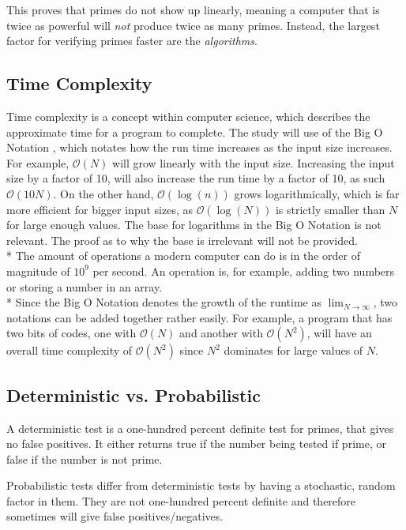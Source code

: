 \documentclass[main.tex]{subfiles}
\begin{document}
This proves that primes do not show up linearly, meaning a computer that is
twice as powerful will \textit{not} produce twice as many primes. Instead, the
largest factor for verifying primes faster are the \textit{algorithms}.

\subsection{Time Complexity}

Time complexity \cite{theorem:time_comp} is a concept within computer science,
which describes the approximate time for a program to complete. The study will
use of the Big O Notation \cite{theorem:big_O}, which notates how the run time
increases as the input size increases. For example, $\mathcal{O}(N)$ will grow
linearly with the input size. Increasing the input size by a factor of 10, will
also increase the run time by a factor of 10, as such $\mathcal{O}(10N)$. On the
other hand, $\mathcal{O}(\log(n))$ grows logarithmically, which is far more
efficient for bigger input sizes, as $\mathcal{O}(\log(N))$ is strictly smaller
than $N$ for large enough values. The base for logarithms in the Big O Notation
is not relevant. The proof as to why the base is irrelevant will not be
provided. \newline
\\*
The amount of operations a modern computer can do is in the order of magnitude
of $10^{9}$ per second. An operation is, for example, adding two numbers or
storing a number in an array. \newline
\\*
Since the Big O Notation denotes the growth of the runtime as
$\lim_{N\to\infty}$, two notations can be added together rather easily. For
example, a program that has two bits of codes, one with $\mathcal{O}(N)$ and
another with $\mathcal{O}(N^{2})$, will have an overall time complexity of
$\mathcal{O}(N^{2})$ since $N^{2}$ dominates for large values of $N$.

\subsection{Deterministic vs. Probabilistic}
A deterministic test is a one-hundred percent definite test for primes, that
gives no false positives. It either returns true if the number being tested if
prime, or false if the number is not prime. \newline

Probabilistic tests differ from deterministic tests by having a stochastic,
random factor in them. They are not one-hundred percent definite and therefore
sometimes will give false positives/negatives. \\
\end{document}
